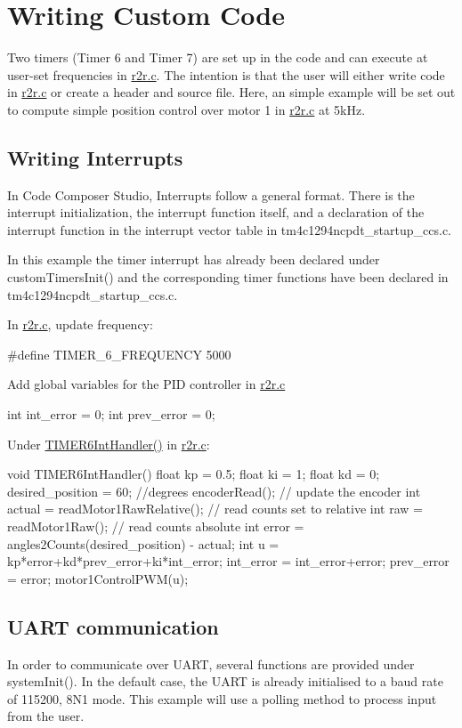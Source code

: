 \hypertarget{index_writingcustomcode}{}\section{Writing Custom Code}\label{index_writingcustomcode}
Two timers (Timer 6 and Timer 7) are set up in the code and can execute at user-\/set frequencies in {\ttfamily \mbox{\hyperlink{r2r_8c}{r2r.\+c}}}. The intention is that the user will either write code in \mbox{\hyperlink{r2r_8c}{r2r.\+c}} or create a header and source file. Here, an simple example will be set out to compute simple position control over motor 1 in \mbox{\hyperlink{r2r_8c}{r2r.\+c}} at 5k\+Hz.\hypertarget{index_writinginterrupts}{}\subsection{Writing Interrupts}\label{index_writinginterrupts}
In Code Composer Studio, Interrupts follow a general format. There is the interrupt initialization, the interrupt function itself, and a declaration of the interrupt function in the interrupt vector table in {\ttfamily tm4c1294ncpdt\+\_\+startup\+\_\+ccs.\+c}.

In this example the timer interrupt has already been declared under {\ttfamily custom\+Timers\+Init()} and the corresponding timer functions have been declared in {\ttfamily tm4c1294ncpdt\+\_\+startup\+\_\+ccs.\+c}.

In {\ttfamily \mbox{\hyperlink{r2r_8c}{r2r.\+c}}}, update frequency\+: \begin{DoxyVerb}    #define TIMER_6_FREQUENCY 5000
\end{DoxyVerb}


Add global variables for the P\+ID controller in {\ttfamily \mbox{\hyperlink{r2r_8c}{r2r.\+c}}} \begin{DoxyVerb}int int_error = 0;
int prev_error = 0;
\end{DoxyVerb}


Under {\ttfamily \mbox{\hyperlink{r2r_8c_a57b21594b75d4b2a140a1f9bbb1465e8}{T\+I\+M\+E\+R6\+Int\+Handler()}}} in {\ttfamily \mbox{\hyperlink{r2r_8c}{r2r.\+c}}}\+: \begin{DoxyVerb}void TIMER6IntHandler(){
    float kp = 0.5;
    float ki = 1;
    float kd = 0;
    desired_position = 60; //degrees
    encoderRead(); // update the encoder
    int actual = readMotor1RawRelative(); // read counts set to relative
    int raw = readMotor1Raw(); // read counts absolute
    int error = angles2Counts(desired_position) - actual;
    int u = kp*error+kd*prev_error+ki*int_error;
     int_error = int_error+error;
     prev_error = error;
    motor1ControlPWM(u);
 }  
\end{DoxyVerb}
\hypertarget{index_communication}{}\subsection{U\+A\+R\+T communication}\label{index_communication}
In order to communicate over U\+A\+RT, several functions are provided under {\ttfamily system\+Init()}. In the default case, the U\+A\+RT is already initialised to a baud rate of 115200, 8\+N1 mode. This example will use a polling method to process input from the user.


